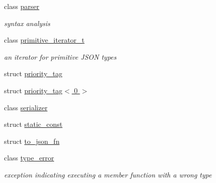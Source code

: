 \begin{DoxyCompactItemize}
class \hyperlink{classnlohmann_1_1detail_1_1parser}{parser}
\begin{DoxyCompactList}\small\item\em syntax analysis \end{DoxyCompactList}\item 
class \hyperlink{classnlohmann_1_1detail_1_1primitive__iterator__t}{primitive\+\_\+iterator\+\_\+t}
\begin{DoxyCompactList}\small\item\em an iterator for primitive J\+S\+ON types \end{DoxyCompactList}\item 
struct \hyperlink{structnlohmann_1_1detail_1_1priority__tag}{priority\+\_\+tag}
\item 
struct \hyperlink{structnlohmann_1_1detail_1_1priority__tag_3_010_01_4}{priority\+\_\+tag$<$ 0 $>$}
\item 
class \hyperlink{classnlohmann_1_1detail_1_1serializer}{serializer}
\item 
struct \hyperlink{structnlohmann_1_1detail_1_1static__const}{static\+\_\+const}
\item 
struct \hyperlink{structnlohmann_1_1detail_1_1to__json__fn}{to\+\_\+json\+\_\+fn}
\item 
class \hyperlink{classnlohmann_1_1detail_1_1type__error}{type\+\_\+error}
\begin{DoxyCompactList}\small\item\em exception indicating executing a member function with a wrong type \end{DoxyCompactList}\end{DoxyCompactItemize}
